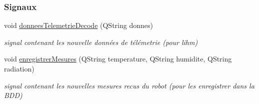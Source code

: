 \subsubsection*{Signaux}
\begin{DoxyCompactItemize}
\item 
void \hyperlink{class_rov_ae868f3f3d691fcd6ecb97ee770541475}{donnees\+Telemetrie\+Decode} (Q\+String donnes)
\begin{DoxyCompactList}\small\item\em signal contenant les nouvelle données de télémetrie (pour l\textquotesingle{}ihm) \end{DoxyCompactList}\item 
void \hyperlink{class_rov_a180b955cc5ee7e01196299377e0c5f33}{enregistrer\+Mesures} (Q\+String temperature, Q\+String humidite, Q\+String radiation)
\begin{DoxyCompactList}\small\item\em signal contenant les nouvelles mesures recus du robot (pour les enregistrer dans la B\+DD) \end{DoxyCompactList}\end{DoxyCompactItemize}
